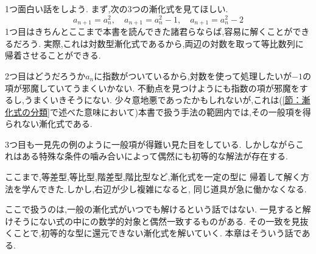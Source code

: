 1つ面白い話をしよう.
まず,次の3つの漸化式を見てほしい.
\[
  a_{n+1}=a_n^2,
  \quad
  a_{n+1}=a_n^2-1,
  \quad
  a_{n+1}=a_n^2-2
\]
1つ目はきちんとここまで本書を読んできた諸君らならば,容易に解くことができるだろう.
実際,これは対数型漸化式であるから,両辺の対数を取って等比数列に帰着させることができる.

2つ目はどうだろうか$a_n$に指数がついているから,対数を使って処理したいが$-1$の項が邪魔していてうまくいかない.
不動点を見つけようにも指数の項が邪魔をするし,うまくいきそうにない.
少々意地悪であったかもしれないが,これは(\ref{節：漸化式の分類}で述べた意味において)本書で扱う手法の範囲内では,その一般項を得られない漸化式である.

3つ目も一見先の例のように一般項が得難い見た目をしている.
しかしながらこれはある特殊な条件の噛み合いによって偶然にも初等的な解法が存在する.

ここまで,等差型,等比型,階差型,階比型など,漸化式を一定の型に
帰着して解く方法を学んできた.しかし,右辺が少し複雑になると,
同じ道具が急に働かなくなる.

ここで扱うのは,一般の漸化式がいつでも解けるという話ではない.
一見すると解けそうにない式の中にの数学的対象と偶然一致するものがある.
その一致を見抜くことで,初等的な型に還元できない漸化式を解いていく.
本章はそういう話である.